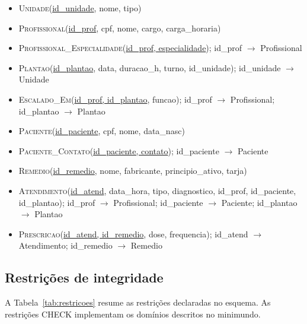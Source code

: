 \documentclass[10pt,a4paper]{article}
\begin{document}
{\small
\begin{itemize}
  \item \textsc{Unidade}(\underline{id\_unidade}, nome, tipo)
  \item \textsc{Profissional}(\underline{id\_prof}, cpf, nome, cargo, carga\_horaria)
  \item \textsc{Profissional\_Especialidade}(\underline{id\_prof, especialidade}); id\_prof $\rightarrow$ Profissional
  \item \textsc{Plantao}(\underline{id\_plantao}, data, duracao\_h, turno, id\_unidade); id\_unidade $\rightarrow$ Unidade
  \item \textsc{Escalado\_Em}(\underline{id\_prof, id\_plantao}, funcao); id\_prof $\rightarrow$ Profissional; id\_plantao $\rightarrow$ Plantao
  \item \textsc{Paciente}(\underline{id\_paciente}, cpf, nome, data\_nasc)
  \item \textsc{Paciente\_Contato}(\underline{id\_paciente, contato}); id\_paciente $\rightarrow$ Paciente
  \item \textsc{Remedio}(\underline{id\_remedio}, nome, fabricante, principio\_ativo, tarja)
  \item \textsc{Atendimento}(\underline{id\_atend}, data\_hora, tipo, diagnostico, id\_prof, id\_paciente, id\_plantao); id\_prof $\rightarrow$ Profissional; id\_paciente $\rightarrow$ Paciente; id\_plantao $\rightarrow$ Plantao
  \item \textsc{Prescricao}(\underline{id\_atend, id\_remedio}, dose, frequencia); id\_atend $\rightarrow$ Atendimento; id\_remedio $\rightarrow$ Remedio
\end{itemize}}

\subsection{Restrições de integridade}\label{sec:restricoes}

A Tabela~\ref{tab:restricoes} resume as restrições declaradas no esquema. As restrições CHECK \cite{mysql-check} implementam os domínios descritos no minimundo.
\end{document}
